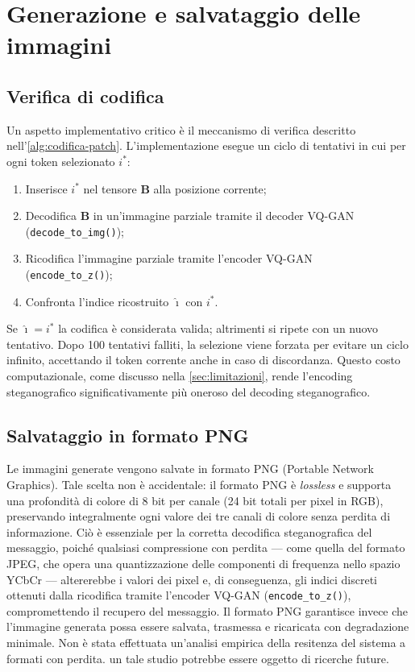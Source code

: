 \section{Generazione e salvataggio delle immagini}
\label{sec:generazione-immagini}

\subsection{Verifica di codifica}

Un aspetto implementativo critico è il meccanismo di verifica descritto nell'\autoref{alg:codifica-patch}. L'implementazione esegue un ciclo di tentativi in cui per ogni token selezionato $i^*$:
\begin{enumerate}
	\item Inserisce $i^*$ nel tensore $\mathbf{B}$ alla posizione corrente;
	\item Decodifica $\mathbf{B}$ in un'immagine parziale tramite il decoder VQ-GAN (\texttt{decode\_to\_img()});
	\item Ricodifica l'immagine parziale tramite l'encoder VQ-GAN \\(\texttt{encode\_to\_z()});
	\item Confronta l'indice ricostruito $\hat{\imath}$ con $i^*$.
\end{enumerate}
Se $\hat{\imath} = i^*$ la codifica è considerata valida; altrimenti si ripete con un nuovo tentativo. Dopo 100 tentativi falliti, la selezione viene forzata per evitare un ciclo infinito, accettando il token corrente anche in caso di discordanza. Questo costo computazionale, come discusso nella \autoref{sec:limitazioni}, rende l'encoding steganografico significativamente più oneroso del decoding steganografico.

\subsection{Salvataggio in formato PNG}

Le immagini generate vengono salvate in formato PNG (Portable Network Graphics). Tale scelta non è accidentale: il formato PNG è \emph{lossless} e supporta una profondità di colore di 8 bit per canale (24 bit totali per pixel in RGB), preservando integralmente ogni valore dei tre canali di colore senza perdita di informazione. Ciò è essenziale per la corretta decodifica steganografica del messaggio, poiché qualsiasi compressione con perdita — come quella del formato JPEG, che opera una quantizzazione delle componenti di frequenza nello spazio YCbCr — altererebbe i valori dei pixel e, di conseguenza, gli indici discreti ottenuti dalla ricodifica tramite l'encoder VQ-GAN (\texttt{encode\_to\_z()}), compromettendo il recupero del messaggio. Il formato PNG garantisce invece che l'immagine generata possa essere salvata, trasmessa e ricaricata con degradazione minimale. Non è stata effettuata un'analisi empirica della resitenza del sistema a formati con perdita. un tale studio potrebbe essere oggetto di ricerche future.

